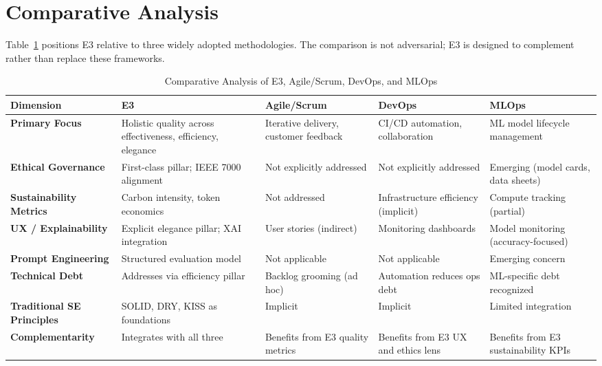 \documentclass[11pt,a4paper]{article}
\begin{document}
\section{Comparative Analysis}

Table~\ref{tab:comparison} positions E3 relative to three widely adopted methodologies. The comparison is not adversarial; E3 is designed to complement rather than replace these frameworks.

\begin{table}[t]
\centering
\caption{Comparative Analysis of E3, Agile/Scrum, DevOps, and MLOps}
\label{tab:comparison}
\small
\begin{tabularx}{\textwidth}{@{}l X X X X@{}}
\toprule
\textbf{Dimension} & \textbf{E3} & \textbf{Agile/Scrum} & \textbf{DevOps} & \textbf{MLOps} \\
\midrule
\textbf{Primary Focus} & Holistic quality across effectiveness, efficiency, elegance & Iterative delivery, customer feedback & CI/CD automation, collaboration & ML model lifecycle management \\
\addlinespace
\textbf{Ethical Governance} & First-class pillar; IEEE 7000 alignment & Not explicitly addressed & Not explicitly addressed & Emerging (model cards, data sheets) \\
\addlinespace
\textbf{Sustainability Metrics} & Carbon intensity, token economics & Not addressed & Infrastructure efficiency (implicit) & Compute tracking (partial) \\
\addlinespace
\textbf{UX / Explainability} & Explicit elegance pillar; XAI integration & User stories (indirect) & Monitoring dashboards & Model monitoring (accuracy-focused) \\
\addlinespace
\textbf{Prompt Engineering} & Structured evaluation model & Not applicable & Not applicable & Emerging concern \\
\addlinespace
\textbf{Technical Debt} & Addresses via efficiency pillar & Backlog grooming (ad hoc) & Automation reduces ops debt & ML-specific debt recognized \\
\addlinespace
\textbf{Traditional SE Principles} & SOLID, DRY, KISS as foundations & Implicit & Implicit & Limited integration \\
\addlinespace
\textbf{Complementarity} & Integrates with all three & Benefits from E3 quality metrics & Benefits from E3 UX and ethics lens & Benefits from E3 sustainability KPIs \\
\bottomrule
\end{tabularx}
\end{table}
\end{document}
